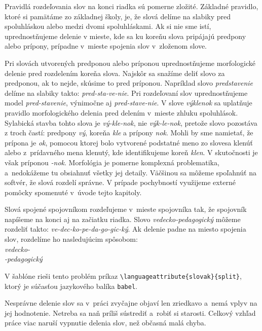Pravidlá rozdeľovania slov na konci riadka sú pomerne zložité. 
Základné pravidlo, ktoré si pamätáme zo základnej školy,
je, že slová delíme na slabiky pred spoluhláskou alebo medzi 
dvomi spoluhláskami.
Ak si nie sme istí, uprednostňujeme delenie v mieste,
kde sa ku koreňu slova pripájajú predpony alebo prípony,
prípadne v~mieste spojenia slov v~zloženom slove.

Pri slovách utvorených predponou alebo príponou
uprednostňujeme morfologické delenie
pred rozdelením koreňa slova.
Najskôr sa snažíme deliť slovo za predponou,
ak to nejde, skúsime to pred príponou.
Napríklad slovo \emph{predstavenie}
delíme na slabiky takto: \emph{pred-sta-ve-nie}.
Pri rozdeľovaní slov uprednostňujeme model
\emph{pred-stavenie}, výnimočne aj \emph{pred-stave-nie}.
V slove \emph{výklenok} sa uplatňuje pravidlo morfologického 
delenia pred delením v~mieste zhluku spoluhlások.
Sylabická stavba tohto slova je \emph{vý-kle-nok},
nie \emph{výk-le-nok},
pretože slovo pozostáva z troch častí: predpony \emph{vý},
koreňa \emph{kle} a prípony \emph{nok}.
Mohli by sme namietať, že prípona je \emph{ok},
pomocou ktorej bolo vytvorené podstatné meno zo slovesa
klenúť alebo z~prídavného mena klenutý,
kde identifikujeme koreň \emph{klen}.
V skutočnosti je však príponou \emph{-nok}.
Morfológia je pomerne komplexná problematika,
a~nedokážeme tu obsiahnuť všetky jej detaily.
Väčšinou sa môžeme spoľahnúť na softvér,
že slová rozdelí správne.
V prípade pochybností využijeme externé pomôcky spomenuté
v~úvode tejto kapitoly. 

Slová spojené spojovníkom rozdeľujeme v~mieste spojovníka tak,
že spojovník napíšeme na konci aj na začiatku riadka.
Slovo \emph{vedecko-pedagogický} môžeme rozdeliť takto:
\emph{ve-dec-ko-pe-da-go-gic-ký}.
Ak delenie padne na miesto spojenia slov,
rozdelíme ho nasledujúcim spôsobom:\\
\indent\emph{vedecko-}\\
\indent\emph{-pedagogický}

V šablóne rieši tento problém príkaz
\verb|\languageattribute{slovak}{split}|,
ktorý je súčasťou jazykového balíka \verb|babel|.

Nesprávne delenie slov sa v~práci zvyčajne objaví
len zriedkavo a~nemá vplyv na jej hodnotenie.
Netreba sa naň príliš sústrediť a~robiť si starosti.
Celkový vzhľad práce viac naruší vypnutie delenia slov,
než občasná malá chyba.

